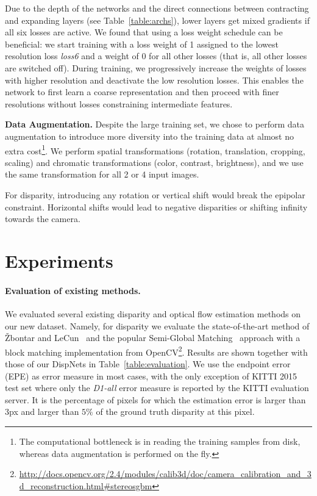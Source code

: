 \documentclass[10pt,twocolumn,letterpaper]{article}
\begin{document}
Due to the depth of the networks and the direct connections between contracting and expanding layers (see Table~\ref{table:archs}), lower layers get mixed gradients if all six losses are active. We found that using a loss weight schedule can be beneficial: we start training with a loss weight of 1 assigned to the lowest resolution loss \emph{loss6} and a weight of 0 for all other losses (that is, all other losses are switched off). During training, we progressively increase the weights of losses with higher resolution and deactivate the low resolution losses. This enables the network to first learn a coarse representation and then proceed with finer resolutions without losses constraining intermediate features.

\textbf{Data Augmentation.}
Despite the large training set, we chose to perform data augmentation to introduce more diversity into the training data at almost no extra cost\footnote{The computational bottleneck is in reading the training samples from disk, whereas data augmentation is performed on the fly.}.
We perform spatial transformations (rotation, translation, cropping, scaling) and chromatic transformations (color, contrast, brightness), and we use the same transformation for all 2 or 4 input images.

For disparity, introducing any rotation or vertical shift would break the epipolar constraint. Horizontal shifts would lead to negative disparities or shifting infinity towards the camera.

\section{Experiments}\label{sec:experiments}
\paragraph{Evaluation of existing methods.}
We evaluated several existing disparity and optical flow estimation methods on our new dataset.
Namely, for disparity we evaluate the state-of-the-art method of {\v{Z}}bontar and 
LeCun~\cite{zbontar2015stereo} and the popular Semi-Global Matching~\cite{Hirschmueller2008PAMI} 
approach with a block matching implementation from OpenCV\footnote{\url{http://docs.opencv.org/2.4/modules/calib3d/doc/camera_calibration_and_3d_reconstruction.html\#stereosgbm}}.
Results are shown together with those of our DispNets in Table~\ref{table:evaluation}.
We use the endpoint error (EPE) as error measure in most cases, with the only exception of KITTI 2015 test set where only the \emph{D1-all} error measure is reported by the KITTI evaluation server.
It is the percentage of pixels for which the estimation error is larger than $3$px and larger than $5 \%$ of the ground truth disparity at this pixel.
\end{document}
